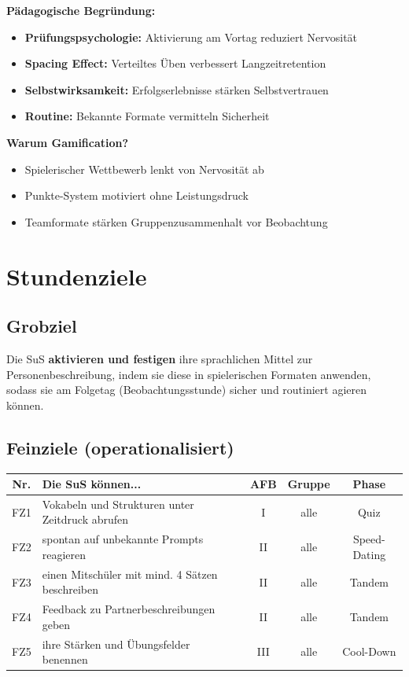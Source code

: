 \documentclass[11pt,a4paper]{article}
\begin{document}
\textbf{Pädagogische Begründung:}
\begin{itemize}
    \item \textbf{Prüfungspsychologie:} Aktivierung am Vortag reduziert Nervosität
    \item \textbf{Spacing Effect:} Verteiltes Üben verbessert Langzeitretention
    \item \textbf{Selbstwirksamkeit:} Erfolgserlebnisse stärken Selbstvertrauen
    \item \textbf{Routine:} Bekannte Formate vermitteln Sicherheit
\end{itemize}

\textbf{Warum Gamification?}
\begin{itemize}
    \item Spielerischer Wettbewerb lenkt von Nervosität ab
    \item Punkte-System motiviert ohne Leistungsdruck
    \item Teamformate stärken Gruppenzusammenhalt vor Beobachtung
\end{itemize}

\section{Stundenziele}

\subsection{Grobziel}
Die SuS \textbf{aktivieren und festigen} ihre sprachlichen Mittel zur Personenbeschreibung, indem sie diese in spielerischen Formaten anwenden, sodass sie am Folgetag (Beobachtungsstunde) sicher und routiniert agieren können.

\subsection{Feinziele (operationalisiert)}

\begin{tabular}{|c|p{6.5cm}|c|c|c|}
\hline
\textbf{Nr.} & \textbf{Die SuS können...} & \textbf{AFB} & \textbf{Gruppe} & \textbf{Phase} \\
\hline
FZ1 & Vokabeln und Strukturen unter Zeitdruck abrufen & I & alle & Quiz \\
\hline
FZ2 & spontan auf unbekannte Prompts reagieren & II & alle & Speed-Dating \\
\hline
FZ3 & einen Mitschüler mit mind. 4 Sätzen beschreiben & II & alle & Tandem \\
\hline
FZ4 & Feedback zu Partnerbeschreibungen geben & II & alle & Tandem \\
\hline
FZ5 & ihre Stärken und Übungsfelder benennen & III & alle & Cool-Down \\
\hline
\end{tabular}
\end{document}

